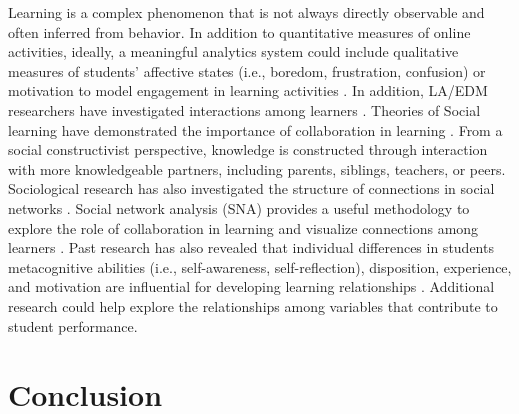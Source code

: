 \documentclass[sigconf]{acmart}
\begin{document}
Learning is a complex phenomenon that is not always directly observable and 
often inferred from behavior. In addition to quantitative measures of online
activities, ideally, a meaningful analytics system could include qualitative
measures of students' affective states (i.e., boredom, frustration, confusion) 
or motivation to model engagement in learning activities 
\cite{baker14, pardos14}. In addition, LA/EDM researchers have investigated
interactions among learners \cite{dawson14}. Theories of Social learning have 
demonstrated the importance of collaboration in learning \cite{vygotsky78}. 
From a social constructivist perspective, knowledge is constructed through 
interaction with more knowledgeable partners, including parents, siblings, 
teachers, or peers. Sociological research has also investigated the structure 
of connections in social networks \cite{granovetter73}. Social network analysis
(SNA) provides a useful methodology to explore the role of collaboration in 
learning and visualize connections among learners \cite{siemens13}.
Past research has also revealed that individual differences in students
metacognitive abilities (i.e., self-awareness, self-reflection), disposition, 
experience, and motivation are influential for developing learning relationships 
\cite{gasevic15 lang17,lester19, papamitsiou14}. Additional research could help 
explore the relationships among variables that contribute to student performance. 


\section{Conclusion}
\end{document}
